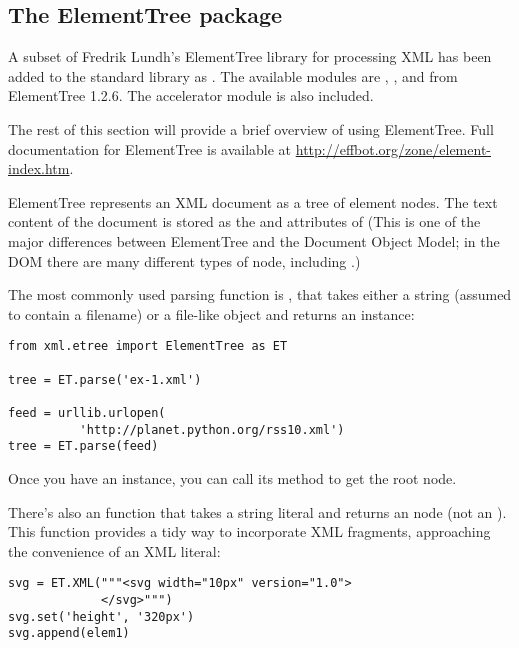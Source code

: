 \documentclass{howto}
\begin{document}
\subsection{The ElementTree package\label{module-etree}}

A subset of Fredrik Lundh's ElementTree library for processing XML has
been added to the standard library as .  The
available modules are
, , and
 from ElementTree 1.2.6.   
The  accelerator module is also included. 

The rest of this section will provide a brief overview of using
ElementTree.  Full documentation for ElementTree is available at
\url{http://effbot.org/zone/element-index.htm}.

ElementTree represents an XML document as a tree of element nodes.
The text content of the document is stored as the 
and  attributes of 
(This is one of the major differences between ElementTree and 
the Document Object Model; in the DOM there are many different
types of node, including .)

The most commonly used parsing function is , that
takes either a string (assumed to contain a filename) or a file-like
object and returns an  instance:

\begin{verbatim}
from xml.etree import ElementTree as ET

tree = ET.parse('ex-1.xml')

feed = urllib.urlopen(
          'http://planet.python.org/rss10.xml')
tree = ET.parse(feed)
\end{verbatim}

Once you have an  instance, you
can call its  method to get the root  node.

There's also an  function that takes a string literal
and returns an  node (not an ).  
This function provides a tidy way to incorporate XML fragments,
approaching the convenience of an XML literal:

\begin{verbatim}
svg = ET.XML("""<svg width="10px" version="1.0">
             </svg>""")
svg.set('height', '320px')
svg.append(elem1)
\end{verbatim}
\end{document}
